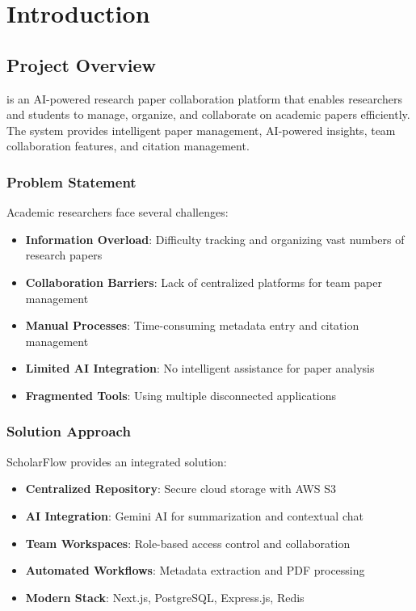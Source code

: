 \chapter{Introduction}
\label{ch:introduction}

\section{Project Overview}
\label{sec:project-overview}

\projectname{} is an AI-powered research paper collaboration platform that enables researchers and students to manage, organize, and collaborate on academic papers efficiently. The system provides intelligent paper management, AI-powered insights, team collaboration features, and citation management.

\subsection{Problem Statement}

Academic researchers face several challenges:

\begin{itemize}[leftmargin=*,topsep=5pt,itemsep=3pt]
    \item \textbf{Information Overload}: Difficulty tracking and organizing vast numbers of research papers
    \item \textbf{Collaboration Barriers}: Lack of centralized platforms for team paper management  
    \item \textbf{Manual Processes}: Time-consuming metadata entry and citation management
    \item \textbf{Limited AI Integration}: No intelligent assistance for paper analysis
    \item \textbf{Fragmented Tools}: Using multiple disconnected applications
\end{itemize}

\subsection{Solution Approach}

ScholarFlow provides an integrated solution:

\begin{itemize}[leftmargin=*,topsep=5pt,itemsep=3pt]
    \item \textbf{Centralized Repository}: Secure cloud storage with AWS S3
    \item \textbf{AI Integration}: Gemini AI for summarization and contextual chat
    \item \textbf{Team Workspaces}: Role-based access control and collaboration
    \item \textbf{Automated Workflows}: Metadata extraction and PDF processing
    \item \textbf{Modern Stack}: Next.js, PostgreSQL, Express.js, Redis
\end{itemize}
